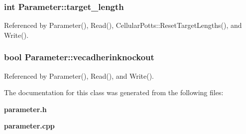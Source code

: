 \subsubsection[{target\-\_\-length}]{\setlength{\rightskip}{0pt plus 5cm}int Parameter\-::target\-\_\-length}\label{classParameter_a633d4f4d84c30aa4c415987666899daf}


Referenced by Parameter(), Read(), Cellular\-Potts\-::\-Reset\-Target\-Lengths(), and Write().

\subsubsection[{vecadherinknockout}]{\setlength{\rightskip}{0pt plus 5cm}bool Parameter\-::vecadherinknockout}\label{classParameter_af988e19cde95eccda16ea2f709aab03a}


Referenced by Parameter(), Read(), and Write().



The documentation for this class was generated from the following files\-:\begin{DoxyCompactItemize}
\item 
{\bf parameter.\-h}\item 
{\bf parameter.\-cpp}\end{DoxyCompactItemize}
